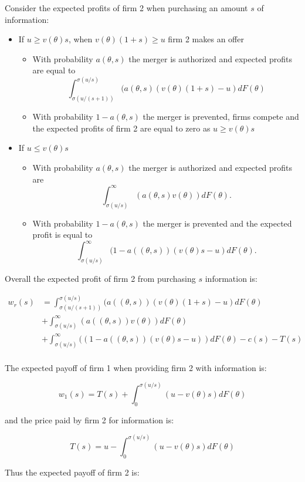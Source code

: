 \documentclass[a4paper,leqno]{article}%
\renewcommand{\t}{\theta}
\newcommand{\s}{\sigma}
\begin{document}
Consider the expected profits of firm 2 when purchasing an amount $s$ of information:

\begin{itemize}
    \item If $u\geq v(\t)s$, when $v(\t)(1+s)\geq u$ firm 2 makes an offer
    \begin{itemize}
        \item With probability $a(\t,s)$ the merger is authorized and expected profits are equal to $$\int_{\s(u/(s+1))}^{\s(u/s)}(a(\t,s)(v(\t)(1+s)-u)dF(\t)$$
        \item With probability $1-a(\t,s)$ the merger is prevented, firms compete and the expected profits of firm 2 are equal to zero as $u\geq v(\t)s$
    \end{itemize}
    \item If $u\leq v(\t)s$
    \begin{itemize}
        \item With probability $a(\t,s)$ the merger is authorized and expected profits are
        $$\int_{\s(u/s)}^{\infty}(a(\t,s)v(\t))dF(\t).$$
        \item With probability $1-a(\t,s)$ the merger is prevented and the expected profit is equal to $$\int_{\s(u/s)}^\infty (1-a((\t,s))(v(\t)s-u)dF(\t).$$
    \end{itemize} 
\end{itemize}

Overall the expected profit of firm 2 from purchasing $s$ information is:

\begin{equation}
    \begin{aligned}
w_r(s)&=\int_{\s(u/(s+1))}^{\s(u/s)}(a((\t,s))(v(\t)(1+s)-u)dF(\t)\\ 
    &+\int_{\s(u/s)}^{\infty}(a((\t,s))v(\t))dF(\t)\\
    &+\int_{\s(u/s)}^\infty ((1-a((\t,s))(v(\t)s-u))dF(\t)-c(s)-T(s)\\
\end{aligned}
\end{equation}


The expected payoff of firm 1 when providing firm 2 with information is:

$$w_1(s)=T(s)+\int_{0}^{\s(u/s)}(u-v(\t)s)dF(\t)$$

and the price paid by firm 2 for information is:

$$T(s)=u-\int_{0}^{\s(u/s)}(u-v(\t)s)dF(\t)$$

Thus the expected payoff of firm 2 is:
\end{document}
